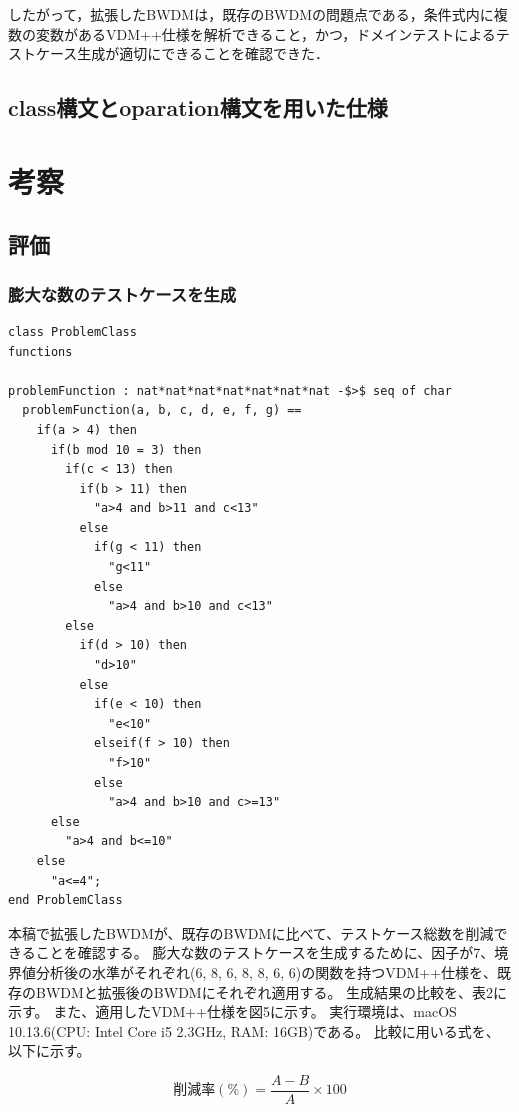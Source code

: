 \documentclass[uplatex, report, a4j, 10pt]{jsbook}
\begin{document}
したがって，拡張したBWDMは，既存のBWDMの問題点である，条件式内に複数の変数があるVDM++仕様を解析できること，かつ，ドメインテストによるテストケース生成が適切にできることを確認できた．


\section{class構文とoparation構文を用いた仕様}

\chapter{考察}\label{cha:Evaluation}
\section{評価}
\subsection{膨大な数のテストケースを生成}
\lstset{language=}
\begin{lstlisting}[caption=因子が7、水準が（6 8 6 8 8 6 6）の関数を持つVDM++仕様。,label=fig:pict4javaIndication]
class ProblemClass
functions

problemFunction : nat*nat*nat*nat*nat*nat*nat -$>$ seq of char
  problemFunction(a, b, c, d, e, f, g) ==
    if(a > 4) then
      if(b mod 10 = 3) then
        if(c < 13) then
          if(b > 11) then
            "a>4 and b>11 and c<13"
          else
            if(g < 11) then
              "g<11"
            else
              "a>4 and b>10 and c<13"
        else
          if(d > 10) then
            "d>10"
          else
            if(e < 10) then
              "e<10"
            elseif(f > 10) then
              "f>10"
            else
              "a>4 and b>10 and c>=13"
      else
        "a>4 and b<=10"
    else
      "a<=4";
end ProblemClass
\end{lstlisting}

本稿で拡張したBWDMが、既存のBWDMに比べて、テストケース総数を削減できることを確認する。
膨大な数のテストケースを生成するために、因子が7、境界値分析後の水準がそれぞれ(6, 8, 6, 8, 8, 6, 6)の関数を持つVDM++仕様を、既存のBWDMと拡張後のBWDMにそれぞれ適用する。
生成結果の比較を、表2に示す。
また、適用したVDM++仕様を図5に示す。
実行環境は、macOS 10.13.6(CPU: Intel Core i5 2.3GHz, RAM: 16GB)である。
比較に用いる式を、以下に示す。

\begin{equation}
  削減率(\%) = \frac{A - B}{A} \times 100
\end{equation}
\end{document}
